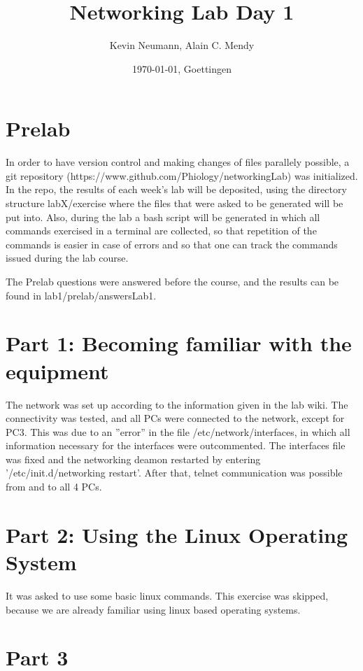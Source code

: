 \documentclass[a4paper, 11pt]{article}
\title{Networking Lab Day 1}
\author{Kevin Neumann, Alain C. Mendy}
\date{\today{}, Goettingen}
\begin{document}
\maketitle
\tableofcontents
\section{Prelab}

In order to have version control and making changes of files parallely possible, a git repository (https://www.github.com/Phiology/networkingLab)
was initialized. In the repo, the results of each week's lab will be deposited, using the directory structure labX/exercise where the files that 
were asked to be generated will be put into. Also, during the lab a bash script will be generated in which all commands exercised 
in a terminal are collected, so that repetition of the commands is easier in case of errors and so that one can track the commands
issued during the lab course.
 
The Prelab questions were answered before the course, and the results can be found in lab1/prelab/answersLab1.

\section{Part 1: Becoming familiar with the equipment}

The network was set up according to the information given in the lab wiki. The connectivity was tested, and all
PCs were connected to the network, except for PC3. This was due to an ''error'' in the file /etc/network/interfaces,
in which all information necessary for the interfaces were outcommented. The interfaces file was fixed and the networking deamon
restarted by entering '/etc/init.d/networking restart'. After that, telnet communication was possible from and to all
4 PCs.

\section{Part 2: Using the Linux Operating System}

It was asked to use some basic linux commands. This exercise was skipped, because we are already familiar using linux based operating systems.

\section{Part 3}
\end{document}
